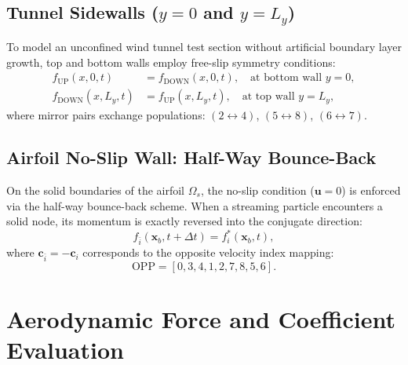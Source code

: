 \documentclass[11pt,a4paper]{article}
\begin{document}
\subsection{Tunnel Sidewalls ($y=0$ and $y=L_y$)}
To model an unconfined wind tunnel test section without artificial boundary layer growth, top and bottom walls employ free-slip symmetry conditions:
\begin{align}
f_{\text{UP}}(x, 0, t) &= f_{\text{DOWN}}(x, 0, t), \quad \text{at bottom wall } y = 0, \\
f_{\text{DOWN}}(x, L_y, t) &= f_{\text{UP}}(x, L_y, t), \quad \text{at top wall } y = L_y,
\end{align}
where mirror pairs exchange populations: $(2 \leftrightarrow 4)$, $(5 \leftrightarrow 8)$, $(6 \leftrightarrow 7)$.

\subsection{Airfoil No-Slip Wall: Half-Way Bounce-Back}
On the solid boundaries of the airfoil $\Omega_s$, the no-slip condition ($\mathbf{u} = 0$) is enforced via the half-way bounce-back scheme. When a streaming particle encounters a solid node, its momentum is exactly reversed into the conjugate direction:
\begin{equation}
f_{\bar{i}}(\mathbf{x}_b, t + \Delta t) = f_i^*(\mathbf{x}_b, t),
\end{equation}
where $\mathbf{c}_{\bar{i}} = -\mathbf{c}_i$ corresponds to the opposite velocity index mapping:
\begin{equation}
\mathrm{OPP} = [0, 3, 4, 1, 2, 7, 8, 5, 6].
\end{equation}

\section{Aerodynamic Force and Coefficient Evaluation}
\end{document}

